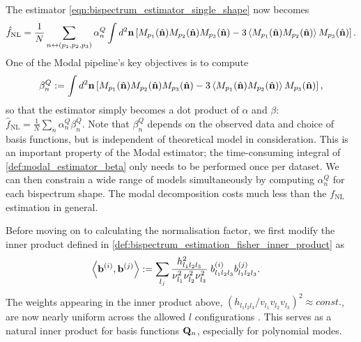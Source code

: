 The estimator \eqref{eqn:bispectrum_estimator_single_shape} now becomes
\begin{align}
	\hat{f}_\text{NL} = \frac{1}{N} \sum_{n \newline \leftrightarrow (p_1,p_2,p_3)} \alpha_n^Q \int d^2 \vv{n} \left[ M_{p_1}(\hat{\vv{n}}) M_{p_2}(\hat{\vv{n}}) M_{p_3}(\hat{\vv{n}}) - 3 \left< M_{p_1}(\hat{\vv{n}}) M_{p_2}(\hat{\vv{n}}) \right> M_{p_3}(\hat{\vv{n}})  \right].
\end{align}
One of the Modal pipeline's key objectives is to compute
\begin{align}
	\beta^Q_n := \int d^2 \mathbf{n} \left[ M_{p_1}(\hat{\mathbf{n}}) M_{p_2}(\hat{\mathbf{n}}) M_{p_3}(\hat{\mathbf{n}}) - 3 \left< M_{p_1}(\hat{\mathbf{n}}) M_{p_2}(\hat{\mathbf{n}}) \right> M_{p_3}(\hat{\mathbf{n}})  \right], \label{def:modal_estimator_beta}
\end{align}
so that the estimator simply becomes a dot product of $\alpha$ and $\beta$: $\hat{f}_\text{NL} = \frac{1}{N} \sum_n \alpha^Q_n \beta^Q_n$. Note that $\beta_n^Q$ depends on the observed data and choice of basis functions, but is independent of theoretical model in consideration. This is an important property of the Modal estimator; the time-consuming integral of \eqref{def:modal_estimator_beta} only needs to be performed once per dataset. We can then constrain a wide range of models simultaneously by computing $\alpha^Q_n$ for each bispectrum shape. The modal decomposition costs much less than the $f_\text{NL}$ estimation in general.

Before moving on to calculating the normalisation factor, we first modify the inner product defined in \eqref{def:bispectrum_estimation_fisher_inner_product} as
\begin{align}
	\left< \mathbf{b}^{(i)}, \mathbf{b}^{(j)} \right> &:= \sum_{l_j} \frac{h^2_{l_1 l_2 l_3}}{\nu_{l_1}^2 \nu_{l_2}^2 \nu_{l_3}^2 } \; b^{(i)}_{l_1 l_2 l_3} b^{(j)}_{l_1 l_2 l_3}.
\end{align}
The weights appearing in the inner product above, $(h_{l_1 l_2 l_3}/v_{l_1} v_{l_2} v_{l_3})^2\approx const.$, are now nearly uniform across the allowed $l$ configurations \cite{Fergusson2010general}. This serves as a natural inner product for basis functions $\mathbf{Q}_n$, especially for polynomial modes.


